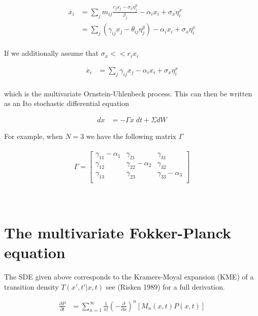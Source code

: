 \documentclass{article}
\begin{document}
\begin{align*}
\dot{x_{i}} &= \sum_{j}m_{ij}\frac{r_{j}x_{j} - \sigma_{x}\eta_{j}^{y}}{\beta_{j}} - \alpha_{i} x_{i} + \sigma_{x}\eta_{i}^{x}\\
&= \sum_{j}\left(\gamma_{ij}x_{j} - \theta_{ij}\eta_{j}^{y}\right) - \alpha_{i} x_{i} + \sigma_{x}\eta_{i}^{x}\\
\end{align*}

If we additionally assume that $\sigma_{x} << r_{i}x_{i}$

\begin{align*}
\dot{x_{i}} &= \sum_{j}\gamma_{ij}x_{j} - \alpha_{i} x_{i} + \sigma_{x}\eta_{i}^{x}\\
\end{align*}

which is the multivariate Ornstein-Uhlenbeck process. This can then be written as an Ito stochastic differential equation

\begin{align*}
dx &= -\Gamma x\; dt + \Sigma dW 
\end{align*}

For example, when $N=3$ we have the following matrix $\Gamma$
\\
\\
\begin{equation*}
\Gamma = \begin{bmatrix} 
    \gamma_{11}-\alpha_{1} & \gamma_{21} & \gamma_{31}\\
	\gamma_{12} & \gamma_{22} -\alpha_{2} & \gamma_{32}\\
	\gamma_{13} & \gamma_{23} & \gamma_{33}-\alpha_{3}\\
\end{bmatrix}
\end{equation*}
\\
\\

\section{The multivariate Fokker-Planck equation}

The SDE given above corresponds to the Kramers-Moyal expansion (KME) of a transition density $T(x',t'|x,t)$ see (Risken 1989) for a full derivation.

\begin{align}
\frac{\partial P}{\partial t}  &= \sum_{n=1}^{\infty} \frac{1}{n!}\left(-\frac{\partial}{\partial x}\right)^{n} \left[M_{n}(x,t)P(x,t)\right]
\end{align}
\end{document}
